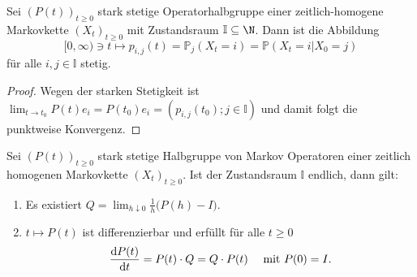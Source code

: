\begin{folg}
  Sei $(P(t))_{t\geq0}$ stark stetige Operatorhalbgruppe einer zeitlich-homogene Markovkette $(X_t)_{t\geq0}$ mit Zustandsraum $\mathbb I\subseteq \N$. Dann ist die Abbildung$$[0,\infty)\ni t\mapsto p_{i,j}(t)=\mathbb P_j(X_t=i)=\mathbb P(X_t=i|X_0=j)$$ für alle $i,j\in\mathbb I$ stetig.
\end{folg}

\begin{proof}
Wegen der starken Stetigkeit ist $\lim_{t\to t_0}P(t)e_i=P(t_0)e_i=(p_{i,j}(t_0);j\in\mathbb I)$ und damit folgt die punktweise Konvergenz.
\end{proof}



\begin{mem}
   Sei $(P(t))_{t\geq0}$ stark stetige Halbgruppe von Markov Operatoren einer zeitlich homogenen Markovkette $(X_t)
   _{t\geq0}$. Ist der Zustandsraum $\mathbb I$ endlich, dann gilt:
   \begin{enumerate}
   \item Es existiert $Q=\lim_{h\downarrow 0}\frac{1}{h}\big(P(h)-I\big)$.
   \item $t\mapsto P(t)$ ist differenzierbar und erfüllt für alle $t\geq0$
    $$\frac{\text d P(t)}{\text dt}=P(t)\cdot Q=Q\cdot P(t)\quad\text{ mit $P(0)=I$}.$$
    \end{enumerate}
\end{mem}

